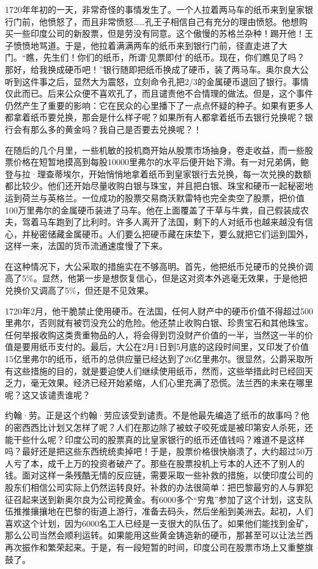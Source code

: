 \documentclass[12pt,oneside]{book}
\begin{document}
\begin{mdframed}
1720年年初的一天，非常奇怪的事情发生了。一个人拉着两马车的纸币来到皇家银行门前，他愤怒了，而且非常愤怒……孔王子相信自己有充分的理由愤怒。他想购买一些印度公司的新股票，但是劳没有同意。这个傲慢的苏格兰杂种！踢开他！王子愤愤地骂道。于是，他拉着满满两车的纸币来到银行门前，径直走进了大门。“瞧，先生们！你们的纸币，所谓‘见票即付’的纸币。现在，你们瞧见了吗？那好，给我换成硬币吧！”银行随即把纸币换成了硬币，装了两马车。奥尔良大公听到这件事之后，显然大为震怒，立刻命令孔把2/3的金属硬币退回了银行。事情仅此而已。后来公众便不喜欢孔了，而且谴责他不合情理的做法。但是，这个事件仍然产生了重要的影响：它在民众的心里播下了一点点怀疑的种子。如果有更多人都拿着纸币要兑换，那会是什么样子呢？如果所有人都拿着纸币去银行兑换呢？银行会有那么多的黄金吗？我自己是否要去兑换呢？！

在随后的几个月里，一些机敏的投机商开始从股票市场抽身，卷走收益，而一些股票价格在短暂地摸高到每股10000里弗尔的水平后便开始下滑。有一对兄弟俩，鲍登与拉·理查蒂埃尔，开始悄悄地拿着纸币到皇家银行去兑换，每一次兑换的数额都比较少。他们还开始尽量收购白银与珠宝，并且把白银、珠宝和硬币一起秘密地运到荷兰与英格兰。一位成功的股票交易商沃默雷特也完全卖空了股票，把价值100万里弗尔的金属硬币装进了马车。他在上面覆盖了干草与牛粪，自己假装成农夫，驾着马车跑到了比利时。许多人离开了法国，剩下的人对纸币也越来越没有信心，并秘密储藏金属硬币。人们要么把硬币藏在床垫下，要么就把它们运到国外，这样一来，法国的货币流通速度慢了下来。

在这种情况下，大公采取的措施实在不够高明。首先，他把纸币兑硬币的兑换价调高了5\%。显然，他第一步是想恢复信心，但是这对资本外逃毫无效果，于是他把兑换价又调高了5\%，但还是不见效果。

1720年2月，他干脆禁止使用硬币。在法国，任何人财产中的硬币价值不得超过500里弗尔，否则就有被罚没充公的危险。他还禁止收购白银、珍贵宝石和其他珠宝。任何举报收购这类贵重物品的人，将会得到罚没财产价值的一半，当然这一半的价值是要用纸币支付的。最后，大公在2月1日到5月底的这段时间里，又印发了价值15亿里弗尔的纸币，纸币的总供应量已经达到了26亿里弗尔。很显然，公爵采取所有这些措施的目的，就是要迫使人们继续使用纸币，然而，这些举措此时已经回天乏力，毫无效果。经济已经开始紧缩，人们心里充满了恐慌。法兰西的未来在哪里呢？这又该谴责谁呢？

约翰·劳。正是这个约翰·劳应该受到谴责。不是他最先编造了纸币的故事吗？他的密西西比计划又怎样了呢？人们在那边除了被蚊子咬死或是被印第安人杀死，还能干些什么呢？印度公司的股票真的比皇家银行的纸币还值钱吗？难道不是这样吗？最好还是把这些东西统统卖掉吧！于是，股票价格很快崩溃了，大约超过50万人亏了本，成千上万的投资者破产了。那些在股票投机上亏本的人还不了别人的钱。面对这样一条残酷无情的反应链，需要采取一些补救的措施，以使印度公司的股东们相信公司实际上仍然运转良好。补救的办法很简单：把巴黎最穷的人与罪犯征召起来送到新奥尔良为公司挖黄金。有6000多个“穷鬼”参加了这个计划，这支队伍推推攘攘地在巴黎的街道上游行，准备去码头，然后坐船到美洲去。起初，人们喜欢这个计划，因为6000名工人已经是一支很大的队伍了。如果他们能找到金矿，那么公司当然会顺利运转。如果能用这些黄金铸造新的硬币，那甚至可以让法兰西再次振作和繁荣起来。于是，有一段短暂的时间，印度公司在股票市场上又重整旗鼓了。


\end{mdframed}
\end{document}
